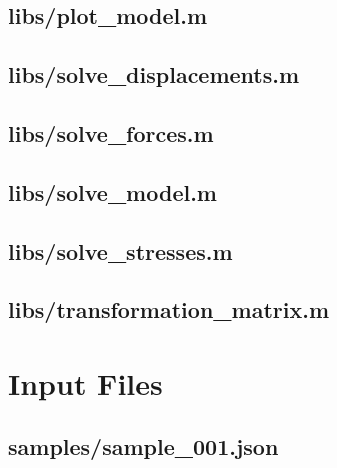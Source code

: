 \documentclass{article}
\begin{document}
\begin{appendices}
\subsection{libs/plot\_model.m}\label{app:libs/plot_model.m}


\subsection{libs/solve\_displacements.m}\label{app:libs/solve_displacements.m}


\subsection{libs/solve\_forces.m}\label{app:libs/solve_forces.m}


\subsection{libs/solve\_model.m}\label{app:libs/solve_model.m}


\subsection{libs/solve\_stresses.m}\label{app:libs/solve_stresses.m}


\subsection{libs/transformation\_matrix.m}\label{app:libs/transformation_matrix.m}





\section{Input Files}

\subsection{samples/sample\_001.json}\label{app:samples/sample_001.json}



\end{appendices}
\end{document}
